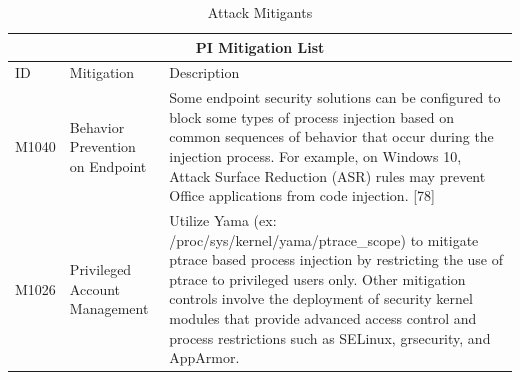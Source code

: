 \documentclass{article}
\begin{document}
\begin{table}[!ht]
  \centering
  \caption{Attack Mitigants \autocite{Mitre:2017}}
\begin{tabular}{ |p{1.2cm}||p{2cm}|p{11.5cm}|  }
  \hline
  \multicolumn{3}{|c|}{PI Mitigation List} \\
  \hline
  ID	& Mitigation & Description \\
  \hline
  M1040	& Behavior Prevention on Endpoint &	Some endpoint security solutions can be configured to block some types of
                                            process injection based on common sequences of behavior that occur during the
                                            injection process. For example, on Windows 10, Attack Surface Reduction (ASR)
                                            rules may prevent Office applications from code injection. [78] \\
  \hline
  M1026 & Privileged Account Management	& Utilize Yama (ex: /proc/sys/kernel/yama/ptrace\_scope) to mitigate ptrace based
                                          process injection by restricting the use of ptrace to privileged users only. Other
                                          mitigation controls involve the deployment of security kernel modules that provide
                                          advanced access control and process restrictions such as SELinux, grsecurity,
                                          and AppArmor. \\
  \hline
\end{tabular}
\label{table: Mitigations}
\end{table}
\end{document}

